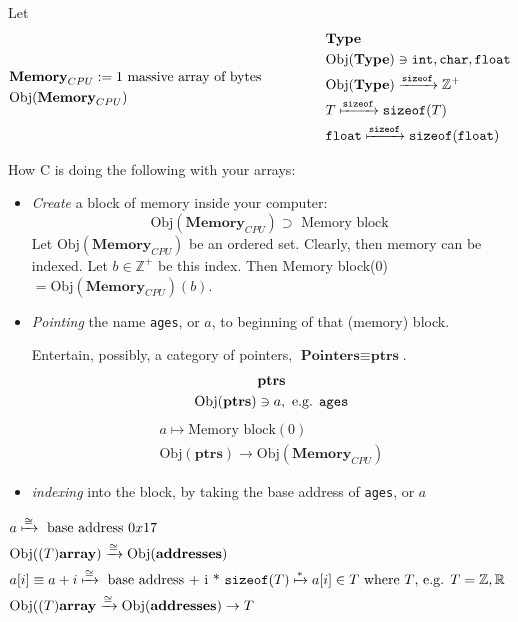 \documentclass[10pt]{amsart}
\begin{document}
Let 
\[
\begin{gathered}
\begin{aligned}
& \textbf{Memory}_{CPU} := 1 \text{ massive array of bytes } \\
& \text{Obj}{(\textbf{Memory}_{CPU})} 
\end{aligned}  \qquad \, \qquad \, 
\begin{aligned}
& \textbf{Type} \\
& \text{Obj}{(\textbf{Type})} \ni \verb|int|, \verb|char|, \verb|float| \\
& \text{Obj}{(\textbf{Type})}  \xrightarrow{\texttt{sizeof}} \mathbb{Z}^+  \\
& T \xmapsto{ \texttt{sizeof} } \verb|sizeof|(T) \\
& \verb|float| \xmapsto{ \texttt{sizeof}} \verb|sizeof|(\verb|float|)
\end{aligned}
\end{gathered}
\]


How C is doing the following with your arrays:  

\begin{itemize}
	\item \emph{Create} a block of memory inside your computer:  
	\[
	\text{Obj}{(\textbf{Memory}_{CPU})} \supset \text{ Memory block }  
	\]
	Let $\text{Obj}{(\textbf{Memory}_{CPU})}$ be an ordered set.  Clearly, then memory can be indexed.  Let $b\in \mathbb{Z}^+$ be this index.  Then Memory block(0) $= \text{Obj}{(\textbf{Memory}_{CPU})}(b)$.  		
	\item \emph{Pointing} the name \verb|ages|, or $a$, to beginning of that (memory) block.  
	
	Entertain, possibly, a category of pointers, $\textbf{Pointers} \equiv \textbf{ptrs}$.  
	\[
	\begin{gathered}
	\textbf{ptrs} \\
	\text{Obj}{(\textbf{ptrs})} \ni a, \text{ e.g. } \verb|ages|  
	\end{gathered}
	\]	
	\[
	\begin{gathered}
	a \mapsto \text{Memory block}(0) \\ 
	\text{Obj}{(\textbf{ptrs})} \to \text{Obj}{(\textbf{Memory}_{CPU})}
	\end{gathered}
	\]
	\item \emph{indexing} into the block, by taking the base address of \verb|ages|, or $a$ 
\end{itemize}

\[
\begin{gathered}
\begin{aligned}
&	a \xmapsto{ \cong } \text{ base address $0x17$ } \\
&	\text{Obj}{((T)\textbf{array})} \xrightarrow{ \cong } \text{Obj}{(\textbf{addresses})}  \\	
&	a[i] \equiv a+i \xmapsto{ \cong } \text{ base address + i * } \verb|sizeof|(T)  \xmapsto{ * } a[i] \in T \text{ where $T$, e.g. $T = \mathbb{Z},\mathbb{R}$ } \\ 
& \text{Obj}{((T)\textbf{array}} \xrightarrow{ \cong } \text{Obj}{(\textbf{addresses})} \to T  
\end{aligned}
\end{gathered}
\]
\end{document}
